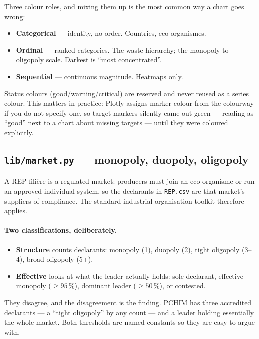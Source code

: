 \documentclass[11pt,a4paper]{article}
\newcommand{\file}[1]{\texttt{#1}}
\begin{document}
Three colour roles, and mixing them up is the most common way a chart goes
wrong:

\begin{itemize}
  \item \textbf{Categorical} --- identity, no order. Countries, eco-organismes.
  \item \textbf{Ordinal} --- ranked categories. The waste hierarchy; the
        monopoly-to-oligopoly scale. Darkest is ``most concentrated''.
  \item \textbf{Sequential} --- continuous magnitude. Heatmaps only.
\end{itemize}

Status colours (good/warning/critical) are reserved and never reused as a
series colour. This matters in practice: Plotly assigns marker colour from the
colourway if you do not specify one, so target markers silently came out green
--- reading as ``good'' next to a chart about missing targets --- until they
were coloured explicitly.

\subsection{\file{lib/market.py} --- monopoly, duopoly, oligopoly}

A REP filière is a regulated market: producers must join an eco-organisme or run
an approved individual system, so the declarants in \file{REP.csv} are that
market's suppliers of compliance. The standard industrial-organisation toolkit
therefore applies.

\paragraph{Two classifications, deliberately.}

\begin{itemize}
  \item \textbf{Structure} counts declarants: monopoly (1), duopoly (2), tight
        oligopoly (3--4), broad oligopoly (5+).
  \item \textbf{Effective} looks at what the leader actually holds: sole
        declarant, effective monopoly ($\geq 95\,\%$), dominant leader
        ($\geq 50\,\%$), or contested.
\end{itemize}

They disagree, and the disagreement is the finding. PCHIM has three accredited
declarants --- a ``tight oligopoly'' by any count --- and a leader holding
essentially the whole market. Both thresholds are named constants so they are
easy to argue with.
\end{document}
